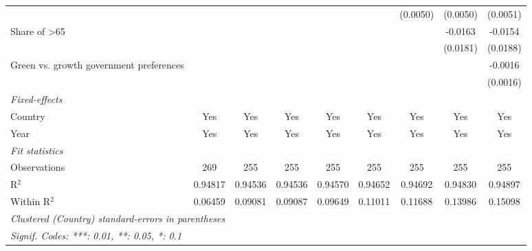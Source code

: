 \begin{table}[htbp]
\begin{tabular}{lcccccccc}
                                                  &               &              &          &          &          & (0.0050) & (0.0050) & (0.0051)\\   
      Share of >65                                &               &              &          &          &          &          & -0.0163  & -0.0154\\   
                                                  &               &              &          &          &          &          & (0.0181) & (0.0188)\\   
      Green vs. growth government preferences     &               &              &          &          &          &          &          & -0.0016\\   
                                                  &               &              &          &          &          &          &          & (0.0016)\\   
      \midrule
      \emph{Fixed-effects}\\
      Country                                     & Yes           & Yes          & Yes      & Yes      & Yes      & Yes      & Yes      & Yes\\  
      Year                                        & Yes           & Yes          & Yes      & Yes      & Yes      & Yes      & Yes      & Yes\\  
      \midrule
      \emph{Fit statistics}\\
      Observations                                & 269           & 255          & 255      & 255      & 255      & 255      & 255      & 255\\  
      R$^2$                                       & 0.94817       & 0.94536      & 0.94536  & 0.94570  & 0.94652  & 0.94692  & 0.94830  & 0.94897\\  
      Within R$^2$                                & 0.06459       & 0.09081      & 0.09087  & 0.09649  & 0.11011  & 0.11688  & 0.13986  & 0.15098\\  
      \midrule \midrule
      \multicolumn{9}{l}{\emph{Clustered (Country) standard-errors in parentheses}}\\
      \multicolumn{9}{l}{\emph{Signif. Codes: ***: 0.01, **: 0.05, *: 0.1}}\\
   \end{tabular}
\end{table}


